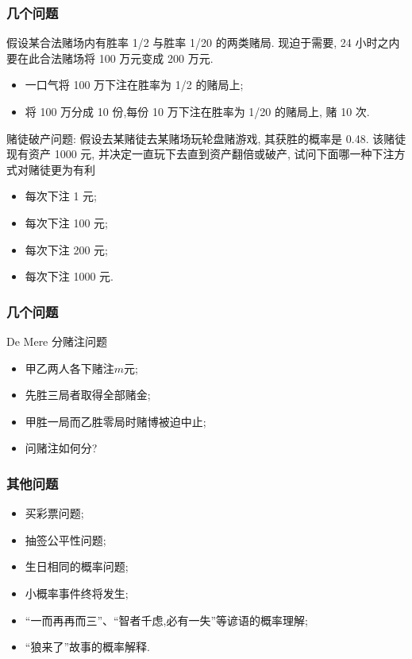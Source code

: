 \documentclass[Prob-All.tex]{subfiles}
\begin{document}
\begin{frame}
	\frametitle{几个问题}

	\begin{prob}
		假设某合法赌场内有胜率 1/2 与胜率 1/20 的两类赌局. 现迫于需要, 24 小时之内要在此合法赌场将 100 万元变成 200 万元.
		\begin{itemize}[<+-|alert@+>]
			\item  一口气将 100 万下注在胜率为 1/2 的赌局上;

			\item  将 100 万分成 10 份,每份 10 万下注在胜率为 1/20 的赌局上, 赌 10 次.
		\end{itemize}

	\end{prob}
	\pause
	\vspace{0.5cm}
	\begin{prob}
		赌徒破产问题: 假设去某赌徒去某赌场玩轮盘赌游戏, 其获胜的概率是 0.48. 该赌徒现有资产 1000 元, 并决定一直玩下去直到资产翻倍或破产, 试问下面哪一种下注方式对赌徒更为有利
		\begin{itemize}[<+-|alert@+>]
			\item 每次下注 1 元;
			\item 每次下注 100 元;
			\item 每次下注 200 元;
			\item 每次下注 1000 元.
		\end{itemize}
	\end{prob}
\end{frame}



\begin{frame}
	\frametitle{几个问题}


	\begin{prob}  {\rm De Mere} 分赌注问题
		\begin{itemize}[<+-|alert@+>]
			\item 甲乙两人各下赌注$m$元;
			\item 先胜三局者取得全部赌金;
			\item 甲胜一局而乙胜零局时赌博被迫中止;
			\item 问赌注如何分?
		\end{itemize}
	\end{prob}
\end{frame}

\begin{frame}
	\frametitle{其他问题}
	\begin{itemize}[<+-|alert@+>]
		\item 买彩票问题;
		\item 抽签公平性问题;
		\item 生日相同的概率问题;
		\item 小概率事件终将发生;
		\item “一而再再而三”、“智者千虑,必有一失”等谚语的概率理解;
		\item “狼来了”故事的概率解释.
	\end{itemize}

\end{frame}
\end{document}
